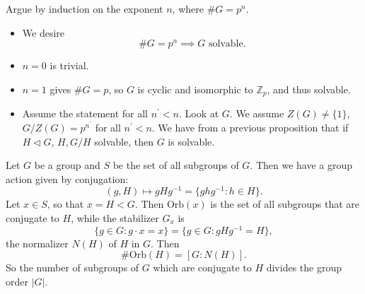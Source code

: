 \documentclass{article}
\begin{document}
Argue by induction on the exponent $n$, where $\# G = p^n$.
\begin{itemize}
  \item{ We desire
  $$
  \# G = p^n \implies G \text{ solvable}.
  $$
  }
  \item{$n=0$ is trivial.}
  \item{$n=1$ gives $\# G = p$, so $G$ is cyclic and isomorphic to
        $\mathbb{Z}_p$, and thus solvable.}
  \item{Assume the statement for all $n^\prime < n$. Look at
        $G$. We assume $Z(G) \neq \{ 1 \}$, $G / Z(G) = p^{n^\prime}$ for
        all $n^\prime < n$. We have from a previous proposition that
        if $H \triangleleft G$, $H, G/H$ solvable, then $G$ is
        solvable.
        }
\end{itemize}

\begin{xmpl}
Let $G$ be a group and $S$ be the set of all subgroups of $G$. Then
we have a group action given by conjugation:
$$
(g, H) \mapsto gHg^{-1} = \{ g h g^{-1} : h \in H \}.
$$
Let $x \in S$, so that $x = H < G$. Then $\mathrm{Orb}(x)$ is the set of
all subgroups that are conjugate to $H$, while the stabilizer $G_x$ is
$$
\{ g \in G : g \cdot x = x \} = \{ g \in G : g H g^{-1} = H \},
$$
the normalizer $N(H)$ of $H$ in $G$. Then
$$
\# \mathrm{Orb}(H) = [G : N(H)].
$$
So the number of subgroups of $G$ which are conjugate to $H$ divides
the group order $|G|$.
\end{xmpl}
\end{document}
